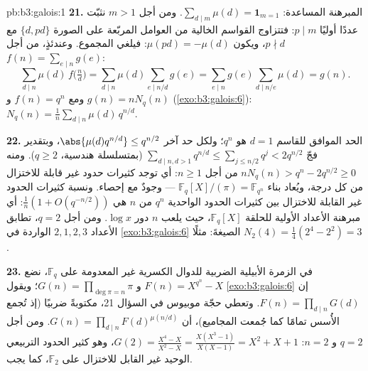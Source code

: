 \begin{solution}{pb:b3:galois:1}
\textbf{21.} المبرهنة المساعدة: $\sum_{d \mid m}\mu(d) = \mathbf
1_{m=1}$. ومن أجل $m > 1$ نثبّت
عددًا أوليًا $p \mid m$: فتتزاوج القواسم الخالية من العوامل
المربّعة على الصورة $\{d, pd\}$ مع $p \nmid d$، ويكون $\mu(pd) = -\mu(d)$:
فيلغي المجموع. وعندئذٍ، من أجل $f(n) =
\sum_{e\mid n}g(e)$:
\[
\sum_{d \mid n}\mu(d)\,f\bigl(\tfrac nd\bigr)
= \sum_{d \mid n}\mu(d)\!\!\sum_{e \mid n/d}\!\!g(e)
= \sum_{e \mid n}g(e)\!\!\sum_{d \mid n/e}\!\!\mu(d)
= g(n) .
\]
ومع $f(n) = q^n$ و $g(n) = nN_q(n)$ (\cref{exo:b3:galois:6}): $N_q(n) =
\frac1n\sum_{d\mid n}\mu(d)\,q^{n/d}$.

\textbf{22.} الحد الموافق للقاسم $d = 1$ هو $q^n$؛ ولكل حد آخر
$\abs{\mu(d)q^{n/d}} \leq q^{n/2}$، وبتقدير فجّ $\sum_{d \mid n, d > 1}q^{n/d} \leq \sum_{j \leq
n/2}q^j < 2q^{n/2}$ (بمتسلسلة هندسية، $q \geq 2$).
ومنه $nN_q(n) >
q^n - 2q^{n/2} \geq 0$ من أجل $n \geq 1$: أي توجد كثيرات حدود غير قابلة
للاختزال من كل درجة، ويُعاد بناء $\mathbb F_q[X]/(\pi) = \mathbb F_{q^n}$ --- وجودٌ مع إحصاء.
ونسبة كثيرات الحدود غير القابلة للاختزال بين كثيرات الحدود
الواحدية $q^n$ من  $n$ هي $\frac1n(1 + O(q^{-n/2}))$: أي مبرهنة الأعداد
الأولية للحلقة $\mathbb F_q[X]$، حيث يلعب $n$ دور $\log x$. ومن
أجل $q = 2$، تطابق الأعداد $2, 1, 2, 3$ الواردة في \cref{exo:b3:galois:6}
الصيغةَ: مثلًا $N_2(4) = \frac14(2^4 - 2^2) = 3$.

\textbf{23.} في الزمرة الأبيلية الضربية للدوال الكسرية غير
المعدومة على $\mathbb F_q$، نضع $F(n) = X^{q^n} -
X$ و $G(n) = \prod_{\deg\pi = n}\pi$؛ ويقول
\cref{exo:b3:galois:6} إن $F(n) = \prod_{d\mid n}G(d)$. وتعطي حجّة موبيوس في السؤال 21، مكتوبةً
ضربيًا (إذ تُجمع الأُسس تمامًا كما جُمعت المجاميع)، أن $G(n) = \prod_{d \mid n}F(d)^{\mu(n/d)}$.
ومن أجل $q = 2$ و $n = 2$: $G(2) = \frac{X^4 - X}{X^2 - X} = \frac{X(X^3 -
1)}{X(X - 1)} = X^2 + X + 1$، وهو كثير الحدود التربيعي
الوحيد غير القابل للاختزال على $\mathbb F_2$، كما يجب.


\end{solution}
